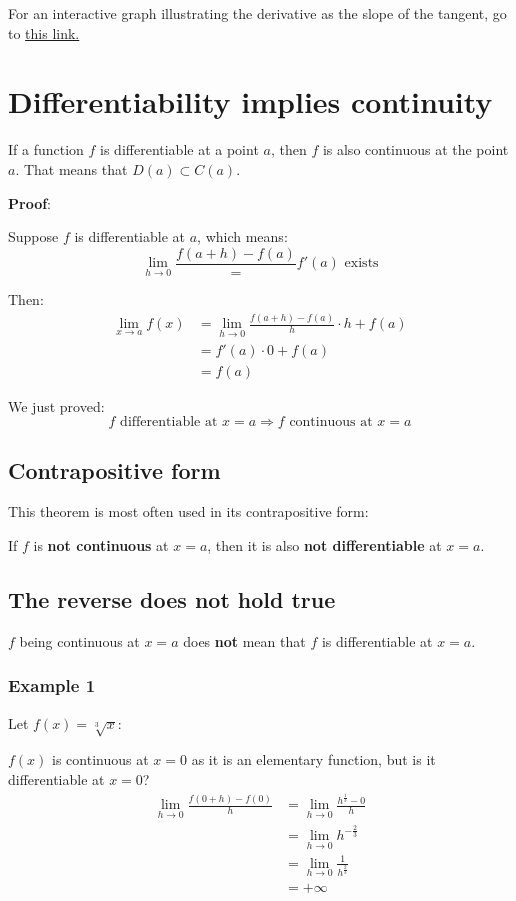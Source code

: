 \documentclass[11pt]{article}
\begin{document}
For an interactive graph illustrating the derivative as the slope of the tangent, go to \href{https://www.desmos.com/calculator/gdn4qknq1w}{this link.}

\newpage
\section{Differentiability implies continuity}
\label{sec:org4805536}
If a function \(f\) is differentiable at a point \(a\), then \(f\) is also continuous at the point \(a\). That means that \(D(a) \subset C(a)\).


\textbf{Proof}:


Suppose \(f\) is differentiable at \(a\), which means:
\[\lim_{h \rightarrow 0} \frac{f(a + h) - f(a)} = f'(a) \text{ exists}\]

Then:
\begin{align*}
\lim_{x \rightarrow a} f(x) &= \lim_{h \rightarrow 0} \frac{f(a+h) - f(a)}{h} \cdot h + f(a) \\
&= f'(a) \cdot 0 + f(a) \\
&= f(a)
\end{align*}

We just proved:
\[f \text{ differentiable at } x = a \Rightarrow f \text{ continuous at } x = a\]
\subsection{Contrapositive form}
\label{sec:org90550a7}
This theorem is most often used in its contrapositive form:


If \(f\) is \textbf{not continuous} at \(x = a\), then it is also \textbf{not differentiable} at \(x = a\).

\newpage
\subsection{The reverse does not hold true}
\label{sec:orgeff6c05}
\(f\) being continuous at \(x = a\) does \textbf{not} mean that \(f\) is differentiable at \(x = a\).
\subsubsection{Example 1}
\label{sec:org54ea906}
Let \(f(x) = \sqrt[3]{x}\):


\(f(x)\) is continuous at \(x = 0\) as it is an elementary function, but is it differentiable at \(x = 0\)?
\begin{align*}
\lim_{h \rightarrow 0} \frac{f(0 + h) - f(0)}{h} &= \lim_{h \rightarrow 0} \frac{h^{\frac{1}{3}} - 0}{h} \\
&= \lim_{h \rightarrow 0} h^{-\frac{2}{3}} \\
&= \lim_{h \rightarrow 0} \frac{1}{h^{\frac{2}{3}}} \\
&= + \infty
\end{align*}
\end{document}
